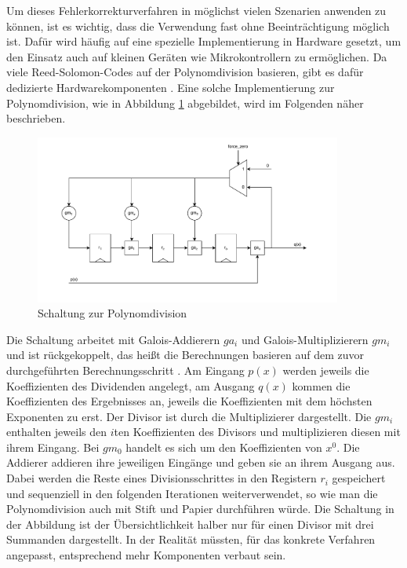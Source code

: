 Um dieses Fehlerkorrekturverfahren in möglichst vielen Szenarien anwenden zu können, ist es wichtig, dass die Verwendung fast ohne Beeinträchtigung möglich ist.
Dafür wird häufig auf eine spezielle Implementierung in Hardware gesetzt, um den Einsatz auch auf kleinen Geräten wie Mikrokontrollern zu ermöglichen.
Da viele Reed-Solomon-Codes auf der Polynomdivision basieren, gibt es dafür dedizierte Hardwarekomponenten \cite{verbeureReedSolomonErrorCorrecting2022}.
Eine solche Implementierung zur Polynomdivision, wie in Abbildung \ref{fig:polynomdivCircuit} abgebildet, wird im Folgenden näher beschrieben.
\begin{figure}[ht]
	\centering
	\includegraphics[width=0.9\textwidth]{figures/Polynomdivision-Hardware.drawio.pdf}
	\caption{Schaltung zur Polynomdivision}
	\label{fig:polynomdivCircuit}
\end{figure}
Die Schaltung arbeitet mit Galois-Addierern $ga_i$ und Galois-Multiplizierern $gm_i$ und ist rückgekoppelt, das heißt die Berechnungen basieren auf dem zuvor durchgeführten Berechnungsschritt \cite{masseyShiftregisterSynthesisBCH1969}.
Am Eingang $p(x)$ werden jeweils die Koeffizienten des Dividenden angelegt, am Ausgang $q(x)$ kommen die Koeffizienten des Ergebnisses an, jeweils die Koeffizienten mit dem höchsten Exponenten zu erst.
Der Divisor ist durch die Multiplizierer dargestellt.
Die $gm_i$ enthalten jeweils den $i$ten Koeffizienten des Divisors und multiplizieren diesen mit ihrem Eingang.
Bei $gm_0$ handelt es sich um den Koeffizienten von $x^0$. 
Die Addierer addieren ihre jeweiligen Eingänge und geben sie an ihrem Ausgang aus.
Dabei werden die Reste eines Divisionsschrittes in den Registern $r_i$ gespeichert und sequenziell in den folgenden Iterationen weiterverwendet, so wie man die Polynomdivision auch mit Stift und Papier durchführen würde.
Die Schaltung in der Abbildung ist der Übersichtlichkeit halber nur für einen Divisor mit drei Summanden dargestellt.
In der Realität müssten, für das konkrete Verfahren angepasst, entsprechend mehr Komponenten verbaut sein.

